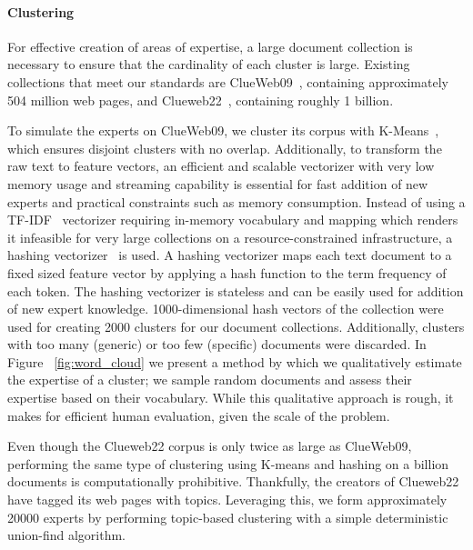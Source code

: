 \paragraph{Clustering} For effective creation of areas of expertise, a large document collection is necessary to ensure that the cardinality of each cluster is large. Existing collections that meet our standards are ClueWeb09~\cite{ClueWeb09}, containing approximately 504 million web pages, and Clueweb22~\cite{overwijk2022clueweb2210billionweb}, containing roughly 1 billion. 

To simulate the experts on ClueWeb09, we cluster its corpus with K-Means~\cite{Hartigan1979}, which ensures disjoint clusters with no overlap. Additionally, to transform the raw text to feature vectors, an efficient and scalable vectorizer with very low memory usage and streaming capability is essential for fast addition of new experts and practical constraints such as memory consumption. Instead of using a TF-IDF~\cite{SALTON1988513,7754750} vectorizer requiring in-memory vocabulary and mapping which renders it infeasible for very large collections on a resource-constrained infrastructure, a hashing vectorizer~\cite{Ramos1999,NIPS2017_f0f6ba4b,engproc2023046005} is used. A hashing vectorizer maps each text document to a fixed sized feature vector by applying a hash function to the term frequency of each token. The hashing vectorizer is stateless and can be easily used for addition of new expert knowledge. 1000-dimensional hash vectors of the collection were used for creating 2000 clusters for our document collections. Additionally, clusters with too many (generic) or too few (specific) documents were discarded. In Figure ~\ref{fig:word_cloud} we present a method by which we qualitatively estimate the expertise of a cluster; we sample random documents and assess their expertise based on their vocabulary. While this qualitative approach is rough, it makes for efficient human evaluation, given the scale of the problem.

Even though the Clueweb22 corpus is only twice as large as ClueWeb09, performing the same type of clustering using K-means and hashing on a billion documents is computationally prohibitive. Thankfully, the creators of Clueweb22 have tagged its web pages with topics. Leveraging this, we form approximately 20000 experts by performing topic-based clustering with a simple deterministic union-find algorithm.

